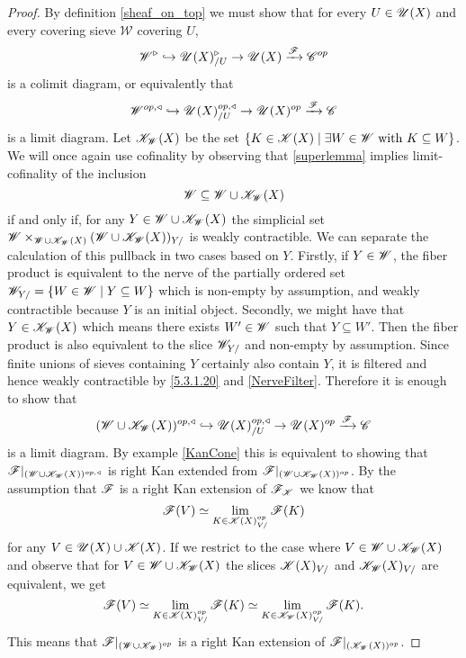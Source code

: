 \documentclass[../../thesis.tex]{subfiles}
\begin{document}
\begin{proof}
    By definition \ref{sheaf_on_top} we must show that for every $U\in \mathscr{U}(X)$ and every covering sieve $\mathscr{W}$ covering $U$,
    \[
        \mathscr{W}^{\triangleright} \hookrightarrow \mathscr{U}(X)_{/U}^{\triangleright} \rightarrow \mathscr{U}(X)\xrightarrow{\mathscr{F}}\mathscr{C}^{op}
    \]
    is a colimit diagram, or equivalently that
    \[
        \mathscr{W}^{op,\triangleleft} \hookrightarrow \mathscr{U}(X)_{/U}^{op,\triangleleft} \rightarrow \mathscr{U}(X)^{op}\xrightarrow{\mathscr{F}}\mathscr{C}
    \]
    is a limit diagram.
    Let $\mathscr{K}_{\mathscr{W}}(X)$ be the set $\{K\in \mathscr{K}(X) \mid \exists W \in \mathscr{W} \text{ with }K \subseteq W \}$.
    We will once again use cofinality by observing that \ref{superlemma} implies  limit-cofinality of the inclusion
    \[
        \mathscr{W} \subseteq \mathscr{W} \cup \mathscr{K}_{\mathscr{W}}(X)
    \]
    if and only if, for any $Y \in \mathscr{W} \cup \mathscr{K}_{\mathscr{W}}(X)$ the simplicial set $\mathscr{W}\times_{\mathscr{W} \cup \mathscr{K}_{\mathscr{W}}(X)}(\mathscr{W} \cup \mathscr{K}_{\mathscr{W}}(X))_{Y/}$ is weakly contractible.
    We can separate the calculation of this pullback in two cases based on $Y$.
    Firstly, if $Y\in \mathscr{W}$, the fiber product is equivalent to the nerve of the partially ordered set $\mathscr{W}_{Y/}=\{W \in \mathscr{W} \mid Y \subseteq W\}$ which is non-empty by assumption, and weakly contractible because $Y$ is an initial object.
    Secondly, we might have that $Y \in \mathscr{K}_{\mathscr{W}}(X)$ which means there exists $W'\in \mathscr{W}$ such that $Y \subseteq W'$.
    Then the fiber product is also equivalent to the slice $\mathscr{W}_{Y/}$ and non-empty by assumption.
    Since finite unions of sieves containing $Y$ certainly also contain $Y$, it is filtered and hence weakly contractible by \ref{5.3.1.20} and \ref{NerveFilter}.
    Therefore it is enough to show that
    \[
        (\mathscr{W} \cup \mathscr{K}_{\mathscr{W}}(X))^{op,\triangleleft} \hookrightarrow \mathscr{U}(X)_{/U}^{op,\triangleleft} \rightarrow \mathscr{U}(X)^{op}\xrightarrow{\mathscr{F}}\mathscr{C}
    \]
    is a limit diagram.
    By example \ref{KanCone} this is equivalent to showing that $\mathscr{F}|_{(\mathscr{W} \cup \mathscr{K}_{\mathscr{W}}(X))^{op,\triangleleft}}$ is right Kan extended from $\mathscr{F}|_{(\mathscr{W} \cup \mathscr{K}_{\mathscr{W}}(X))^{op}}$.
    By the assumption that $\mathscr{F}$ is a right Kan extension of $\mathscr{F}_{\mathscr{K}}$ we know that
    \[
        \mathscr{F}(V)  \simeq \lim_{K\in \mathscr{K}(X)_{V/}^{op}} \mathscr{F}(K)
    \]
    for any $V \in \mathscr{U}(X) \cup \mathscr{K}(X)$.
    If we restrict to the case where $V \in \mathscr{W} \cup \mathscr{K}_{\mathscr{W}}(X)$ and observe that for $V\in \mathscr{W} \cup \mathscr{K}_{\mathscr{W}}(X)$ the slices $ \mathscr{K}(X)_{V/}$ and $ \mathscr{K}_{\mathscr{W}}(X)_{V/}$ are equivalent, we get
    \[
        \mathscr{F}(V) \simeq \lim_{K\in \mathscr{K}(X)_{V/}^{op}} \mathscr{F}(K) \simeq \lim_{K\in \mathscr{K}_{\mathscr{W}}(X)_{V/}^{op}} \mathscr{F}(K).
    \]
    This means that $\mathscr{F}|_{(\mathscr{W} \cup \mathscr{K}_{\mathscr{W}})^{op}}$ is a right Kan extension of $\mathscr{F}|_{(\mathscr{K}_{\mathscr{W}}(X))^{op}}$.

\end{proof}
\end{document}
